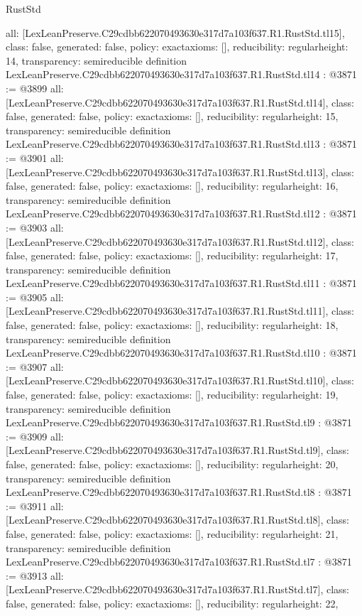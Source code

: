 \begin{lexlean}{RustStd}
\begin{coremodule}
{  all: [LexLeanPreserve.C29cdbb622070493630e317d7a103f637.R1.RustStd.tl15],
  class: false,
  generated: false,
  policy: exact{axioms: []},
  reducibility: regular{height: 14},
  transparency: semireducible
}
definition LexLeanPreserve.C29cdbb622070493630e317d7a103f637.R1.RustStd.tl14 : @3871 := @3899 {
  all: [LexLeanPreserve.C29cdbb622070493630e317d7a103f637.R1.RustStd.tl14],
  class: false,
  generated: false,
  policy: exact{axioms: []},
  reducibility: regular{height: 15},
  transparency: semireducible
}
definition LexLeanPreserve.C29cdbb622070493630e317d7a103f637.R1.RustStd.tl13 : @3871 := @3901 {
  all: [LexLeanPreserve.C29cdbb622070493630e317d7a103f637.R1.RustStd.tl13],
  class: false,
  generated: false,
  policy: exact{axioms: []},
  reducibility: regular{height: 16},
  transparency: semireducible
}
definition LexLeanPreserve.C29cdbb622070493630e317d7a103f637.R1.RustStd.tl12 : @3871 := @3903 {
  all: [LexLeanPreserve.C29cdbb622070493630e317d7a103f637.R1.RustStd.tl12],
  class: false,
  generated: false,
  policy: exact{axioms: []},
  reducibility: regular{height: 17},
  transparency: semireducible
}
definition LexLeanPreserve.C29cdbb622070493630e317d7a103f637.R1.RustStd.tl11 : @3871 := @3905 {
  all: [LexLeanPreserve.C29cdbb622070493630e317d7a103f637.R1.RustStd.tl11],
  class: false,
  generated: false,
  policy: exact{axioms: []},
  reducibility: regular{height: 18},
  transparency: semireducible
}
definition LexLeanPreserve.C29cdbb622070493630e317d7a103f637.R1.RustStd.tl10 : @3871 := @3907 {
  all: [LexLeanPreserve.C29cdbb622070493630e317d7a103f637.R1.RustStd.tl10],
  class: false,
  generated: false,
  policy: exact{axioms: []},
  reducibility: regular{height: 19},
  transparency: semireducible
}
definition LexLeanPreserve.C29cdbb622070493630e317d7a103f637.R1.RustStd.tl9 : @3871 := @3909 {
  all: [LexLeanPreserve.C29cdbb622070493630e317d7a103f637.R1.RustStd.tl9],
  class: false,
  generated: false,
  policy: exact{axioms: []},
  reducibility: regular{height: 20},
  transparency: semireducible
}
definition LexLeanPreserve.C29cdbb622070493630e317d7a103f637.R1.RustStd.tl8 : @3871 := @3911 {
  all: [LexLeanPreserve.C29cdbb622070493630e317d7a103f637.R1.RustStd.tl8],
  class: false,
  generated: false,
  policy: exact{axioms: []},
  reducibility: regular{height: 21},
  transparency: semireducible
}
definition LexLeanPreserve.C29cdbb622070493630e317d7a103f637.R1.RustStd.tl7 : @3871 := @3913 {
  all: [LexLeanPreserve.C29cdbb622070493630e317d7a103f637.R1.RustStd.tl7],
  class: false,
  generated: false,
  policy: exact{axioms: []},
  reducibility: regular{height: 22},
}
\end{coremodule}
\end{lexlean}
